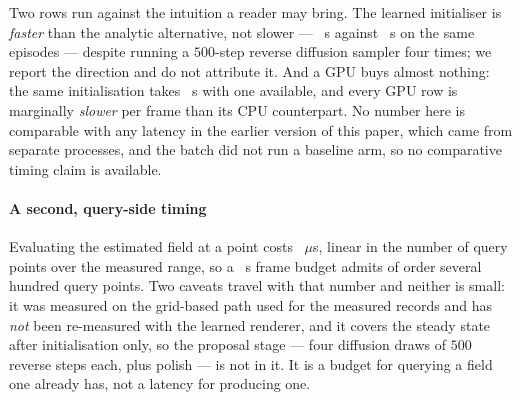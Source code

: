 \documentclass[review]{elsarticle}
\begin{document}
Two rows run against the intuition a reader may bring. The learned initialiser is
\emph{faster} than the analytic alternative, not slower --- \InitSLearn{}~s against
\InitSAna{}~s on the same episodes --- despite running a $500$-step reverse diffusion
sampler four times; we report the direction and do not attribute it. And a GPU buys
almost nothing: the same initialisation takes \InitSLearnGpu{}~s with one available,
and every GPU row is marginally \emph{slower} per frame than its CPU counterpart.
No number here is comparable with any latency in the earlier version of this paper,
which came from separate processes, and the batch did not run a baseline arm, so no
comparative timing claim is available.


\paragraph{A second, query-side timing}
Evaluating the estimated field at a point costs \BudgetUsPerPoint{}~$\mu$s, linear
in the number of query points over the measured range, so a
\BudgetFrameS{}~s frame budget admits of order several hundred query points. Two
caveats travel with that number and neither is small: it was measured on the
grid-based path used for the measured records and has \emph{not} been re-measured
with the learned renderer, and it covers the steady state after initialisation
only, so the proposal stage --- four diffusion draws of $500$ reverse steps each,
plus polish --- is not in it. It is a budget for querying a field one already has,
not a latency for producing one.
\end{document}

